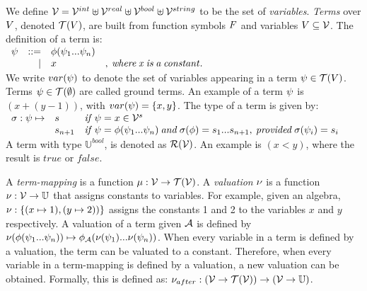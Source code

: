 We define $\mathcal{V} = \mathcal{V}^{int} \uplus \mathcal{V}^{real} \uplus \mathcal{V}^{bool} \uplus \mathcal{V}^{string}$ to be the set of \textit{variables}. \textit{Terms} over $V$, denoted $\mathcal{T}(V)$, are built from function symbols $F$ and variables $V \subseteq \mathcal{V}$. The definition of a term is:
\vspace{8px}\\
$\begin{array}{lrlr}\psi & ::= & \phi(\psi_1 ... \psi_n) &\\ & | & x&\mathit{,\: where\: x\: is\: a\: constant.}\end{array}$
\vspace{8px}\\
We write $var(\psi)$ to denote the set of variables appearing in a term $\psi \in \mathcal{T}(V)$. Terms $\psi\in \mathcal{T}(\emptyset)$ are called ground terms. An example of a term $\psi$ is $(x+(y-1))$, with $var(\psi) = \{x,y\}$. The type of a term is given by:
\vspace{8px}\\
$\begin{array}{lll}\sigma: \psi \mapsto & s       & \mathit{if}\: \psi = x \in \mathcal{V}^s \\ 
 & s_{n+1} & \mathit{if}\: \psi = \phi(\psi_1 ... \psi_n) \mathit{\:and\:} \sigma(\phi) = s_1 ... s_{n+1}\mathit{,\:provided\:} \sigma(\psi_i) = s_i
\end{array}$
\vspace{8px}\\
A term with type $\mathbb{U}^{bool}$, is denoted as $\mathcal{R}(\mathcal{V})$. An example is $(x < y)$, where the result is $\mathit{true}$ or $\mathit{false}$.

A \textit{term-mapping} is a function $\mu:\mathcal{V} \rightarrow \mathcal{T}(\mathcal{V})$. A \textit{valuation} $\nu$ is a function $\nu:\mathcal{V} \rightarrow \mathbb{U}$ that assigns constants to variables. For example, given an algebra, $\nu:\{(x \mapsto 1), (y \mapsto 2))\}$ assigns the constants 1 and 2 to the variables $x$ and $y$ respectively.
A valuation of a term given $\mathcal{A}$ is defined by $\nu(\phi(\psi_1 ... \psi_n)) \mapsto \phi_{\mathcal{A}}(\nu(\psi_1) ... \nu(\psi_n))$. When every variable in a term is defined by a valuation, the term can be valuated to a constant. Therefore, when every variable in a term-mapping is defined by a valuation, a new valuation can be obtained. Formally, this is defined as: $\nu_{after}:(\mathcal{V} \rightarrow \mathcal{T}(\mathcal{V})) \rightarrow (\mathcal{V} \rightarrow \mathbb{U})$.
